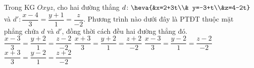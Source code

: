 \begin{ex}%
	Trong KG $Oxyz$, cho hai đường thẳng $d\colon \heva{&x=2+3t\\& y=-3+t\\&z=4-2t}$ và $d'\colon \dfrac{x-4}{3}=\dfrac{y+1}{1}=\dfrac{z}{-2}$. Phương trình nào dưới đây là PTĐT thuộc mặt phẳng chứa $d$ và $d'$, đồng thời cách đều hai đường thẳng đó.
	\choice
	{\True  $\dfrac{x-3}{3}=\dfrac{y+2}{1}=\dfrac{z-2}{-2}$}
	{$\dfrac{x+3}{3}=\dfrac{y+2}{1}=\dfrac{z+2}{-2}$}
	{$\dfrac{x-3}{3}=\dfrac{y-2}{1}=\dfrac{z-2}{-2}$}
	{$\dfrac{x+3}{3}=\dfrac{y-2}{1}=\dfrac{z+2}{-2}$}
\end{ex}

%
%
%
